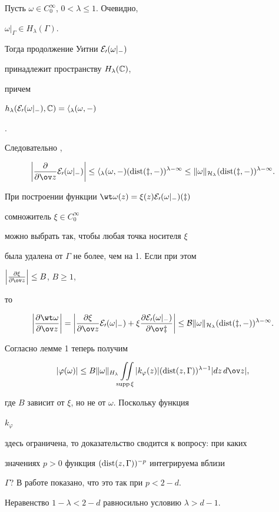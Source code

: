 \begin{pf} Пусть $\omega\in C^\infty_0$, $0<\lambda\le 1$. Очевидно,


$\omega|_\Gamma\in H_\lambda(\Gamma)$. 


Тогда продолжение Уитни $\cal E_0(\omega|_\Gamma)$ 


принадлежит пространству $H_\lambda(\Bbb C)$, 


причем 


$h_\lambda(\cal E_0(\omega|_\Gamma),\Bbb C)=h_\lambda(\omega,\Gamma)$ 


\cite{6}. 


Следовательно \cite{6},


$$ 


\bigg|\myfrac{}{\ov z}\cal E_0(\omega|_\Gamma)\bigg|


\le h_\lambda(\omega,\Gamma)(\dist(z,\Gamma))^{\lambda-1}\le


\|\omega\|_{H_\lambda}(\dist(z,\Gamma))^{\lambda-1}. 


$$ 


При построении функции $\wt\omega(z)=\xi(z)\cal E_0(\omega|_\Gamma)(z)$ 


сомножитель $\xi\in C^\infty_0$ 


можно выбрать так, чтобы любая точка носителя $\xi$ 


была удалена от $\Gamma$ не более, чем на 1. Если при этом 


$\Big|\myfrac{\xi}{\ov z}\Big|\le B$, $B\ge 1$,


то 


$$ 


\bigg|\myfrac{\wt\omega}{\ov z}\bigg|=\bigg| 


\myfrac{\xi}{\ov z}\cal E_0(\omega|_\Gamma)+\xi 


\myfrac{\cal E_0(\omega|_\Gamma)}{\ov z}\bigg| 


\le B\|\omega\|_{H_\lambda}(\dist(z,\Gamma))^{\lambda-1}. 


$$ 


Согласно лемме 1 теперь получим 


\begin{equation} 


|\varphi(\omega)|\le B\|\omega\|_{H_\lambda} 


\iint\limits_{\supp\xi}|k_\varphi(z)|(\dist(z,\Gamma))^{\lambda-1} 


|dz\,d\ov z|, 


\end{equation} 


где $B$ зависит от $\xi$, но не от $\omega$. Поскольку функция 


$k_\varphi$ 


здесь ограничена, то доказательство сводится к вопросу: при каких 


значениях $p>0$ функция $(\operatorname{dist}(z,\Gamma))^{-p}$ интегрируема вблизи 


$\Gamma$? В работе \cite{16} показано, что это так при $p<2-d$.


Неравенство $1-\lambda<2-d$ равносильно условию $\lambda>d-1$. 


\end{pf} 


